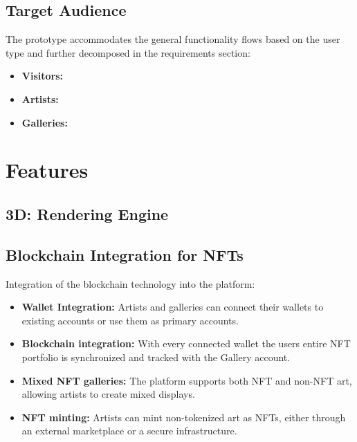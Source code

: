 \section{Target Audience}
The prototype accommodates the general functionality flows based on the user type and further decomposed in the requirements section:

\begin{itemize}
    \item \textbf{Visitors:}
    \item \textbf{Artists:}
    \item \textbf{Galleries:}
\end{itemize}


\chapter{Features}

\section{3D: Rendering Engine}
\section{Blockchain Integration for NFTs}
Integration of the blockchain technology into the platform:
    
    \begin{itemize}
        \item \textbf{Wallet Integration:} Artists and galleries can connect their wallets to existing accounts or use them as primary accounts.
        \item \textbf{Blockchain integration:} With every connected wallet the users entire NFT portfolio is synchronized and tracked with the Gallery account.
        \item \textbf{Mixed NFT galleries:} The platform supports both NFT and non-NFT art, allowing artists to create mixed displays. 
        \item \textbf{NFT minting:} Artists can mint non-tokenized art as NFTs, either through an external marketplace or a secure infrastructure.
    \end{itemize}

